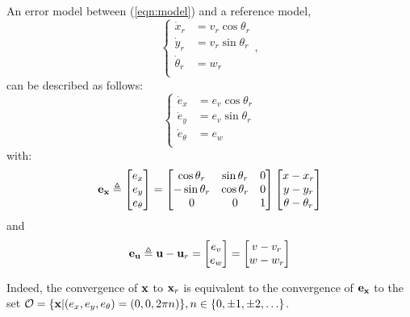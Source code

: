 \documentclass[twocolumn]{IEEEtran} %
\begin{document}
An error model between (\ref{eqn:model}) and a reference model,
\begin{equation}\label{eqn:refmodel}
	\left\{
		\begin{aligned}
			\dot x_r	  &= v_r\cos\theta_r \\
			\dot y_r	  &= v_r\sin\theta_r \\
			\dot \theta_r &= w_r \\
		\end{aligned}
	\right.,
\end{equation}
can be described as follows:
\begin{equation}\label{eqn:errormodel}
	\left\{
		\begin{aligned}
			\dot e_x	    &= e_v\cos\theta_r \\
			\dot e_y	    &= e_v\sin\theta_r \\
			\dot e_\theta &= e_w \\
		\end{aligned}
	\right.
\end{equation}
with:
\begin{equation*}
	{\bf e}_{\bf x} \triangleq \begin{bmatrix}
		e_x \\ e_y \\ e_\theta
	\end{bmatrix} =
	\begin{bmatrix}
		\cos\theta_r  & \sin\theta_r & 0 \\
		-\sin\theta_r & \cos\theta_r & 0 \\
		0		    & 0		    & 1
	\end{bmatrix} 
	\begin{bmatrix}
		x-x_r \\ y-y_r \\ \theta-\theta_r
	\end{bmatrix}
\end{equation*}
and
\begin{equation*}
	{\bf e}_{\bf u} \triangleq {\bf u} - {\bf u}_r = \begin{bmatrix}
		e_v \\ e_w
	\end{bmatrix} =
	\begin{bmatrix}
		v-v_r \\ w-w_r
	\end{bmatrix}
\end{equation*}

Indeed, the convergence of ${\bf x}$ to ${\bf x}_r$ is equivalent to the convergence of ${\bf e_x}$ to the set ${\cal O}=\{{\bf x}|(e_x,e_y,e_\theta)=(0,0,2\pi n)\},n\in \{0,\pm1,\pm2,\ldots\}$.
\end{document}
